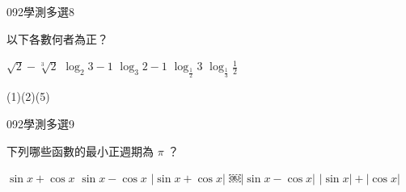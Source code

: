 \begin{QUESTIONS}
    \begin{QUESTION}
        \begin{ExamInfo}{092}{學測}{多選}{8}
        \end{ExamInfo}
        \begin{ExamAnsRateInfo}{55}{86}{60}{19}
        \end{ExamAnsRateInfo}
        \begin{QBODY}
            以下各數何者為正？ 
            \begin{QOPS} 
                \QOP $\sqrt{2} - \sqrt[3]{2}$ 
                \QOP $\log_{2} 3-1$ 
                \QOP $\log_{3}2 -1$ 
                \QOP $\log_{\frac{1}{2}} 3$ 
                \QOP $\log_{\frac{1}{3}} \frac{1}{2}$ 
            \end{QOPS}
        \end{QBODY}
        \begin{QFROMS}
        \end{QFROMS}
        \begin{QTAGS}\end{QTAGS}
        \begin{QANS}
            (1)(2)(5)
        \end{QANS}
        \begin{QSOLLIST}
        \end{QSOLLIST}
        \begin{QEMPTYSPACE}
        \end{QEMPTYSPACE}
    \end{QUESTION}
    \begin{QUESTION}
        \begin{ExamInfo}{092}{學測}{多選}{9}
        \end{ExamInfo}
        \begin{ExamAnsRateInfo}{24}{42}{19}{11}
        \end{ExamAnsRateInfo}
        \begin{QBODY}
            下列哪些函數的最小正週期為 $\pi$ ？ 
            \begin{QOPS} 
                \QOP $\sin x + \cos x$ 
                \QOP $\sin x - \cos x$ 
                \QOP $|\sin x + \cos x|$ 
                \QOP￼$|\sin x - \cos x|$ 
                \QOP $|\sin x| + |\cos x|$
            \end{QOPS}
        \end{QBODY}
        \begin{QFROMS}
        \end{QFROMS}
        \begin{QTAGS}\end{QTAGS}

\end{QUESTION}
\end{QUESTIONS}
